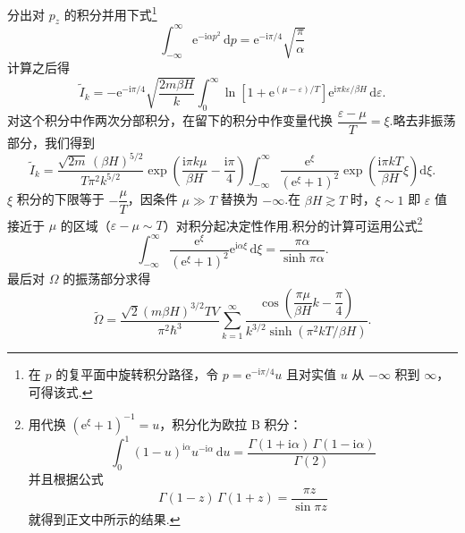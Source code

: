 分出对 $p_z$ 的积分并用下式\footnote{在 $p$ 的复平面中旋转积分路径，令 $p=\mathrm{e}^{-\mathrm{i}\pi/4}u$ 且对实值 $u$ 从 $-\infty$ 积到 $\infty$，可得该式.}
\begin{equation*}
  \int_{-\infty}^{\infty}\mathrm{e}^{-\mathrm{i}\alpha p^2}\,\mathrm{d}p
  =\mathrm{e}^{-\mathrm{i}\pi/4}\sqrt{\frac{\pi}{\alpha}}
\end{equation*}
计算之后得
\begin{equation*}
  \tilde{I}_k=-\mathrm{e}^{-\mathrm{i}\pi/4}\sqrt{\frac{2m\beta H}{k}}
  \int_0^{\infty}\ln\left[1+\mathrm{e}^{(\mu-\varepsilon)/T}\right]
  \mathrm{e}^{\mathrm{i}\pi k\varepsilon/\beta H}\,\mathrm{d}\varepsilon.
\end{equation*}
对这个积分中作两次分部积分，在留下的积分中作变量代换 $\dfrac{\varepsilon-\mu}{T}=\xi$.略去非振荡部分，我们得到
\begin{equation*}
  \tilde{I}_k=\frac{\sqrt{2m}\,(\beta H)^{5/2}}{T\pi^2k^{5/2}}
  \exp\left(\frac{\mathrm{i}\pi k\mu}{\beta H}-\frac{\mathrm{i}\pi}{4}\right)
  \int_{-\infty}^{\infty}\frac{\mathrm{e}^{\xi}}{\left(\mathrm{e}^{\xi}+1\right)^2}
  \exp\left(\frac{\mathrm{i}\pi kT}{\beta H}\xi\right)\mathrm{d}\xi.
\end{equation*}
$\xi$ 积分的下限等于 $-\dfrac{\mu}{T}$，因条件 $\mu\gg T$ 替换为 $-\infty$.在 $\beta H\gtrsim T$ 时，$\xi\sim1$ 即 $\varepsilon$ 值接近于 $\mu$ 的区域（$\varepsilon-\mu\sim T$）对积分起决定性作用.积分的计算可运用公式\footnote{用代换 $(\mathrm{e}^\xi+1)^{-1}=u$，积分化为欧拉 B 积分：
\begin{equation*}
  \int_0^1(1-u)^{\mathrm{i}\alpha}u^{-\mathrm{i}\alpha}\,\mathrm{d}u
  =\frac{\Gamma(1+\mathrm{i}\alpha)\,\Gamma(1-\mathrm{i}\alpha)}{\Gamma(2)}
\end{equation*}
并且根据公式
\begin{equation*}
  \Gamma(1-z)\,\Gamma(1+z)=\frac{\pi z}{\sin\pi z}
\end{equation*}
就得到正文中所示的结果.}
\begin{equation*}
  \int_{-\infty}^{\infty}\frac{\mathrm{e}^{\xi}}{\left(\mathrm{e}^{\xi}+1\right)^2}
  \mathrm{e}^{\mathrm{i}\alpha\xi}\,\mathrm{d}\xi=\frac{\pi\alpha}{\sinh\pi\alpha}.
\end{equation*}
最后对 $\Omega$ 的振荡部分求得
\begin{equation}
  \tilde{\Omega}=\frac{\sqrt{2}\left(m\beta H\right)^{3/2}TV}{\pi^2\hbar^3}
  \sum_{k=1}^{\infty}
  \frac{\cos\left(\dfrac{\pi\mu}{\beta H}k-\dfrac{\pi}{4}\right)}
  {k^{3/2}\sinh\left(\pi^2kT/\beta H\right)}.
\end{equation}

